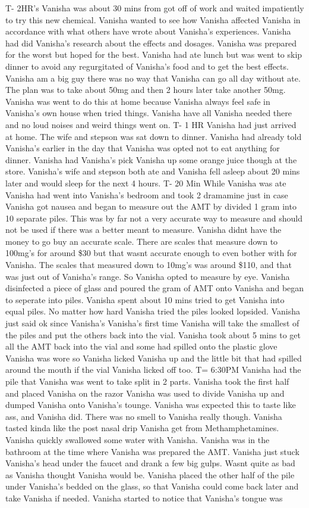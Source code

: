 \documentclass[12pt]{book}
\begin{document}
T- 2HR's Vanisha was about 30 mins from got off of work and waited impatiently to try this new chemical. Vanisha wanted to see how Vanisha affected Vanisha in accordance with what others have wrote about Vanisha's experiences. Vanisha had did Vanisha's research about the effects and dosages. Vanisha was prepared for the worst but hoped for the best. Vanisha had ate lunch but was went to skip dinner to avoid any regurgitated of Vanisha's food and to get the best effects. Vanisha am a big guy there was no way that Vanisha can go all day without ate. The plan was to take about 50mg and then 2 hours later take another 50mg. Vanisha was went to do this at home because Vanisha always feel safe in Vanisha's own house when tried things. Vanisha have all Vanisha needed there and no loud noises and weird things went on. T- 1 HR Vanisha had just arrived at home. The wife and stepson was sat down to dinner. Vanisha had already told Vanisha's earlier in the day that Vanisha was opted not to eat anything for dinner. Vanisha had Vanisha's pick Vanisha up some orange juice though at the store. Vanisha's wife and stepson both ate and Vanisha fell asleep about 20 mins later and would sleep for the next 4 hours. T- 20 Min While Vanisha was ate Vanisha had went into Vanisha's bedroom and took 2 dramamine just in case Vanisha got nausea and began to measure out the AMT by divided 1 gram into 10 separate piles. This was by far not a very accurate way to measure and should not be used if there was a better meant to measure. Vanisha didnt have the money to go buy an accurate scale. There are scales that measure down to 100mg's for around \$30 but that wasnt accurate enough to even bother with for Vanisha. The scales that measured down to 10mg's was around \$110, and that was just out of Vanisha's range. So Vanisha opted to measure by eye. Vanisha disinfected a piece of glass and poured the gram of AMT onto Vanisha and began to seperate into piles. Vanisha spent about 10 mins tried to get Vanisha into equal piles. No matter how hard Vanisha tried the piles looked lopsided. Vanisha just said ok since Vanisha's Vanisha's first time Vanisha will take the smallest of the piles and put the others back into the vial. Vanisha took about 5 mins to get all the AMT back into the vial and some had spilled onto the plastic glove Vanisha was wore so Vanisha licked Vanisha up and the little bit that had spilled around the mouth if the vial Vanisha licked off too. T= 6:30PM Vanisha had the pile that Vanisha was went to take split in 2 parts. Vanisha took the first half and placed Vanisha on the razor Vanisha was used to divide Vanisha up and dumped Vanisha onto Vanisha's tounge. Vanisha was expected this to taste like ass, and Vanisha did. There was no smell to Vanisha really though. Vanisha tasted kinda like the post nasal drip Vanisha get from Methamphetamines. Vanisha quickly swallowed some water with Vanisha. Vanisha was in the bathroom at the time where Vanisha was prepared the AMT. Vanisha just stuck Vanisha's head under the faucet and drank a few big gulps. Wasnt quite as bad as Vanisha thought Vanisha would be. Vanisha placed the other half of the pile under Vanisha's bedded on the glass, so that Vanisha could come back later and take Vanisha if needed. Vanisha started to notice that Vanisha's tongue was 
\end{document}

